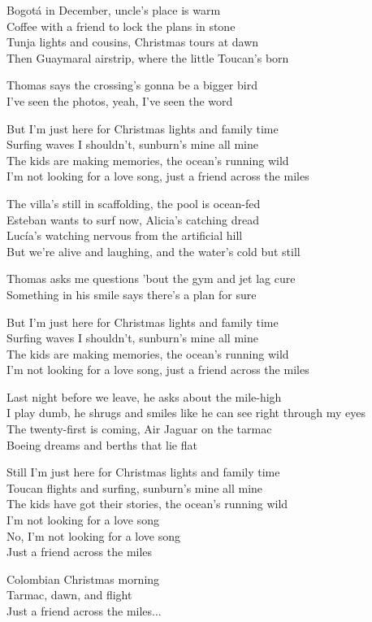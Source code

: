 \begin{lyrics}
Bogotá in December, uncle's place is warm\\
Coffee with a friend to lock the plans in stone\\
Tunja lights and cousins, Christmas tours at dawn\\
Then Guaymaral airstrip, where the little Toucan's born

Thomas says the crossing's gonna be a bigger bird\\
I've seen the photos, yeah, I've seen the word

But I'm just here for Christmas lights and family time\\
Surfing waves I shouldn't, sunburn's mine all mine\\
The kids are making memories, the ocean's running wild\\
I'm not looking for a love song, just a friend across the miles

The villa's still in scaffolding, the pool is ocean-fed\\
Esteban wants to surf now, Alicia's catching dread\\
Lucía's watching nervous from the artificial hill\\
But we're alive and laughing, and the water's cold but still

Thomas asks me questions 'bout the gym and jet lag cure\\
Something in his smile says there's a plan for sure

But I'm just here for Christmas lights and family time\\
Surfing waves I shouldn't, sunburn's mine all mine\\
The kids are making memories, the ocean's running wild\\
I'm not looking for a love song, just a friend across the miles

Last night before we leave, he asks about the mile-high\\
I play dumb, he shrugs and smiles like he can see right through my eyes\\
The twenty-first is coming, Air Jaguar on the tarmac\\
Boeing dreams and berths that lie flat

Still I'm just here for Christmas lights and family time\\
Toucan flights and surfing, sunburn's mine all mine\\
The kids have got their stories, the ocean's running wild\\
I'm not looking for a love song\\
No, I'm not looking for a love song\\
Just a friend across the miles

Colombian Christmas morning\\
Tarmac, dawn, and flight\\
Just a friend across the miles...
\end{lyrics}

